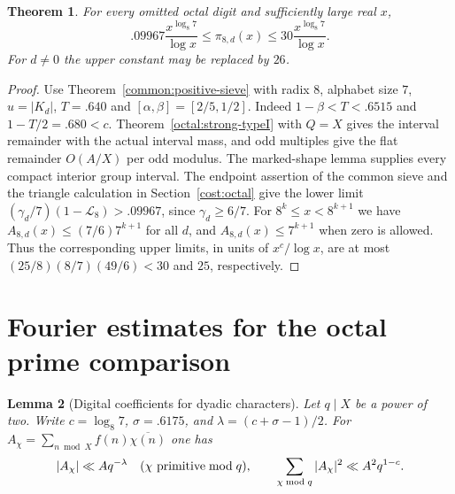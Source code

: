\documentclass[11pt,a4paper]{article}
\theoremstyle{paperplain}
\newtheorem{theorem}{Theorem}[section]
\newtheorem{lemma}[theorem]{Lemma}
\numberwithin{equation}{section}
\begin{document}
\begin{theorem}\label{octal:prime-count}
For every omitted octal digit and sufficiently large real $x$,
\[
 .09967\frac{x^{\log_8 7}}{\log x}\le\pi_{8,d}(x)
 \le30\frac{x^{\log_8 7}}{\log x}.
\]
For $d\ne0$ the upper constant may be replaced by $26$.
\end{theorem}
\begin{proof}
Use Theorem~\ref{common:positive-sieve} with radix $8$, alphabet size
$7$, $u=|K_d|$, $T=.640$ and $[\alpha,\beta]=[2/5,1/2]$.
Indeed $1-\beta<T<.6515$ and $1-T/2=.680<c$.
Theorem~\ref{octal:strong-typeI} with $Q=X$ gives the interval
remainder with the actual interval mass, and odd multiples give the
flat remainder $O(A/X)$ per odd modulus. The marked-shape lemma supplies every compact interior group interval. The endpoint assertion of the common sieve and the triangle
calculation in Section~\ref{cost:octal} give the lower limit
$(\gamma_d/7)(1-\mathscr L_8)>.09967$, since $\gamma_d\ge6/7$.
For $8^k\le x<8^{k+1}$ we have $A_{8,d}(x)\le (7/6)7^{k+1}$
for all $d$, and $A_{8,d}(x)\le7^{k+1}$ when zero is allowed.
Thus the corresponding upper limits, in units of $x^c/\log x$,
are at most $(25/8)(8/7)(49/6)<30$ and $25$, respectively.
\end{proof}


\section{Fourier estimates for the octal prime comparison}
\label{sec:octal-fourier}

\begin{lemma}[Digital coefficients for dyadic characters]
\label{octal:semiprime-digital-char}
Let $q\mid X$ be a power of two. Write \(c=\log_8 7\), \(\sigma=.6175\), and \(\lambda=(c+\sigma-1)/2\). For
\(A_\chi=\sum_{n\bmod X}f(n)\overline{\chi(n)}\) one has
\begin{equation}\label{octal:semiprime-digital-moments}
 |A_\chi|\ll A q^{-\lambda}\quad(\chi\ {\rm primitive}\bmod q),
 \qquad
 \sum_{\chi\bmod q}|A_\chi|^2\ll A^2q^{1-c}.
\end{equation}
\end{lemma}
\end{document}
